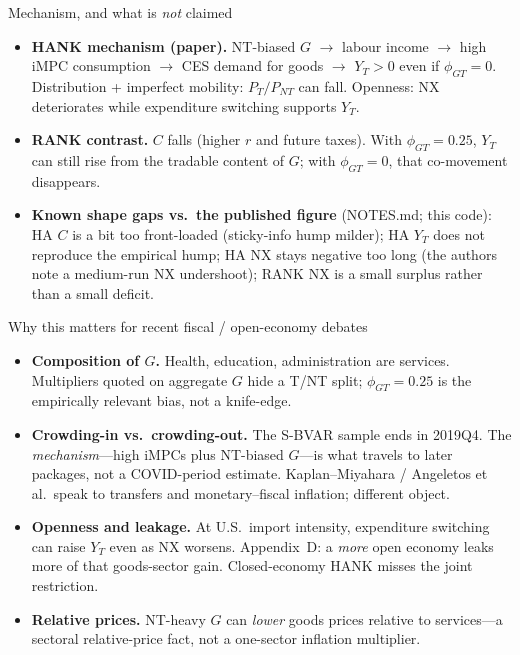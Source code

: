 \documentclass[11pt,aspectratio=169]{beamer}
\begin{document}
\begin{frame}{Mechanism, and what is \emph{not} claimed}
  \begin{itemize}
    \item \textbf{HANK mechanism (paper).}
          NT-biased $G$ $\to$ labour income $\to$ high iMPC consumption
          $\to$ CES demand for goods $\to$ $Y_T>0$ even if $\phi_{GT}=0$.
          Distribution + imperfect mobility: $P_T/P_{NT}$ can fall.
          Openness: NX deteriorates while expenditure switching supports
          $Y_T$.
    \item \textbf{RANK contrast.}
          $C$ falls (higher $r$ and future taxes). With $\phi_{GT}=0.25$,
          $Y_T$ can still rise from the tradable content of $G$; with
          $\phi_{GT}=0$, that co-movement disappears.
    \item \textbf{Known shape gaps vs.\ the published figure}
          (NOTES.md; this code):
          HA $C$ is a bit too front-loaded (sticky-info hump milder);
          HA $Y_T$ does not reproduce the empirical hump;
          HA NX stays negative too long (the authors note a medium-run NX
          undershoot);
          RANK NX is a small surplus rather than a small deficit.
  \end{itemize}
\end{frame}

\begin{frame}{Why this matters for recent fiscal / open-economy debates}
  \begin{itemize}
    \item \textbf{Composition of $G$.}
          Health, education, administration are services. Multipliers quoted
          on aggregate $G$ hide a T/NT split; $\phi_{GT}=0.25$ is the
          empirically relevant bias, not a knife-edge.
    \item \textbf{Crowding-in vs.\ crowding-out.}
          The S-BVAR sample ends in 2019Q4. The \emph{mechanism}---high
          iMPCs plus NT-biased $G$---is what travels to later packages, not
          a COVID-period estimate. Kaplan--Miyahara / Angeletos et al.\ speak
          to transfers and monetary--fiscal inflation; different object.
    \item \textbf{Openness and leakage.}
          At U.S.\ import intensity, expenditure switching can raise $Y_T$
          even as NX worsens. Appendix~D: a \emph{more} open economy leaks
          more of that goods-sector gain. Closed-economy HANK misses the
          joint restriction.
    \item \textbf{Relative prices.}
          NT-heavy $G$ can \emph{lower} goods prices relative to
          services---a sectoral relative-price fact, not a one-sector
          inflation multiplier.
  \end{itemize}
\end{frame}
\end{document}
